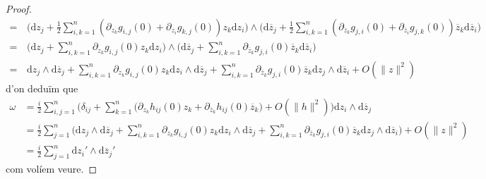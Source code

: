 \begin{lema}
\begin{proof}
\begin{align*}
            =\,
            &\Big(\textrm{d}z_{j}
            +\frac{1}{2}\sum_{i,k=1}^{n}(\partial_{z_{k}}g_{i,j}(0)+\partial_{z_{i}}g_{k,j}(0))z_{k}\textrm{d}z_{i}\Big)
            \wedge\Big(\textrm{d}\overline{z}_{j}
            +\frac{1}{2}\sum_{i,k=1}^{n}(\partial_{\overline{z}_{k}}g_{j,i}(0)+\partial_{\overline{z}_{i}}g_{j,k}(0))\overline{z}_{k}\textrm{d}\overline{z}_{i}\Big)\\
            =\,
            &\Big(\textrm{d}z_{j}
            +\sum_{i,k=1}^{n}\partial_{z_{k}}g_{i,j}(0)z_{k}\textrm{d}z_{i}\Big)
            \wedge\Big(\textrm{d}\overline{z}_{j}
            +\sum_{i,k=1}^{n}\partial_{\overline{z}_{k}}g_{j,i}(0)\overline{z}_{k}\textrm{d}\overline{z}_{i}\Big)\\
            =\,
            &\textrm{d}z_{j}\wedge\textrm{d}\overline{z}_{j}
            +\sum_{i,k=1}^{n}\partial_{z_{k}}g_{i,j}(0)z_{k}\textrm{d}z_{i}\wedge\textrm{d}\overline{z}_{j}
            +\sum_{i,k=1}^{n}\partial_{\overline{z}_{k}}g_{j,i}(0)\overline{z}_{k}\textrm{d}z_{j}\wedge\textrm{d}\overline{z}_{i}
            +O(\|z\|^{2})
        \end{align*}
        d'on deduïm que
        \begin{align*}
            \omega
            &=\frac{i}{2}\sum_{i,j=1}^{n}\Big(\delta_{ij}
            +\sum_{k=1}^{n}\big(\partial_{z_{k}}h_{ij}(0)z_{k}+\partial_{\overline{z}_{k}}h_{ij}(0)\overline{z}_{k}\big)
            +O(\|h\|^{2})\Big)\textrm{d}z_{i}\wedge\textrm{d}\overline{z}_{j}\\
            &=\frac{i}{2}\sum_{j=1}^{n}\Big(\textrm{d}z_{j}\wedge\textrm{d}\overline{z}_{j}
            +\sum_{i,k=1}^{n}\partial_{z_{k}}g_{i,j}(0)z_{k}\textrm{d}z_{i}\wedge\textrm{d}\overline{z}_{j}
            +\sum_{i,k=1}^{n}\partial_{\overline{z}_{k}}g_{j,i}(0)\overline{z}_{k}\textrm{d}z_{j}\wedge\textrm{d}\overline{z}_{i}
            \Big)+O(\|z\|^{2})\\
            &=\frac{i}{2}\sum_{j=1}^{n}
            \textrm{d}z_{i}'\wedge\textrm{d}\overline{z}_{j}'
        \end{align*}
        com volíem veure.
    \end{proof}
\end{lema}
